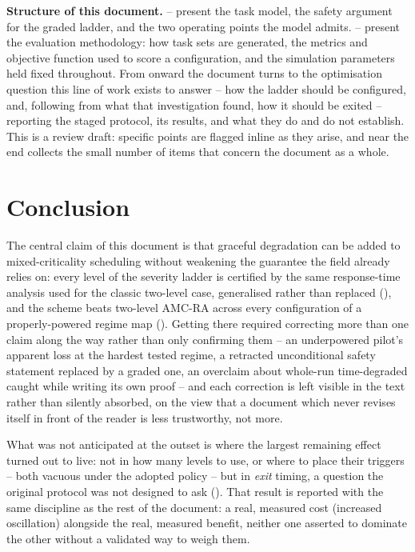 \documentclass{article}
\begin{document}
\textbf{Structure of this document.} --
present the task model, the safety argument for the graded ladder, and the two operating points
the model admits. -- present the evaluation
methodology: how task sets are generated, the metrics and objective function used to score a
configuration, and the simulation parameters held fixed throughout. From
 onward the document turns to the optimisation question
this line of work exists to answer -- how the ladder should be configured, and, following from
what that investigation found, how it should be exited -- reporting the staged protocol,
its results, and what they do and do not establish. This is a review draft: specific points are
flagged inline as they arise, and  near the end collects the small number
of items that concern the document as a whole.







\section{Conclusion}
\label{sec:conclusion}

The central claim of this document is that graceful degradation can be added to mixed-criticality
scheduling without weakening the guarantee the field already relies on: every level of the
severity ladder is certified by the same response-time analysis used for the classic two-level
case, generalised rather than replaced (), and the
scheme beats two-level AMC-RA across every configuration of a properly-powered regime map
(). Getting there required correcting more than one claim along the way
rather than only confirming them -- an underpowered pilot's apparent loss at the hardest tested
regime, a retracted unconditional safety statement replaced by a graded one, an overclaim about
whole-run time-degraded caught while writing its own proof -- and each correction is left visible
in the text rather than silently absorbed, on the view that a document which never revises itself
in front of the reader is less trustworthy, not more.

What was not anticipated at the outset is where the largest remaining effect turned out to live:
not in how many levels to use, or where to place their triggers -- both vacuous under the adopted
policy -- but in \emph{exit} timing, a question the original protocol was not designed to ask
(). That result is reported with the same discipline as the rest of the
document: a real, measured cost (increased oscillation) alongside the real, measured benefit,
neither one asserted to dominate the other without a validated way to weigh them.
\end{document}
